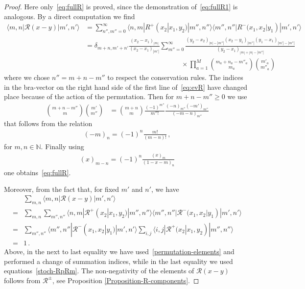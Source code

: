 \documentclass[11pt]{article}
\numberwithin{equation}{section}
\newcommand{\M}{M}
\newcommand{\eR}{\mathcal{R}}
\begin{document}
\begin{proof}

	Here only~\eqref{eq:fullR} is proved, since the demonstration of~\eqref{eq:fullR1} is analogous. By a direct computation we find
	\begin{equation}\label{eq:evR}
		\begin{split}
			\langle m,n|  {\eR}(x-y) |m',n'\rangle
		&=\sum_{n'',m''=0}^\infty \langle n,m|  {R}^+(x_2|x_1,y_2) |m'',n''\rangle \langle m'',n''|  {R}^-(x_1,x_2|y_1) |m',n'\rangle
			\\&=\delta_{m+n,{m'}+{n'}}\frac{(x_2-x_1)_{|m|}}{(x_2-x_1)_{|{m'}|}} \sum_{m''=0}^{\infty}\frac{\left( y_2-x_2\right)_{|n|-|m''|}\left(x_2-y_1\right)_{|m''|}\left(y_1-x_1\right)_{|{m'}|-|m''|}}{\left(y_2-x_1\right)_{|m|+|n|-|m''|}}
			\\&\qquad\qquad\qquad\qquad\qquad\qquad\qquad\times \prod_{a=1}^{\M}\binom{m_{a}+n_{a}-m''_{a}}{m_{a}}\binom{m'_{a}}{m''_{a}}
		\end{split}
	\end{equation}
	where we chose $n''=m+n-m''$ to respect the conservation rules. The indices in the bra-vector on the right hand side of the first line of~\eqref{eq:evR} have changed place because of the action of the permutation. Then for $m+n-m''\geq 0$ we use
	\begin{equation}
		\begin{split}
			\binom{m+n-m''}{m}\binom{m'}{m''}
			&=\binom{m+n}{m}\frac{(-1)^{m''}}{m''!}\frac{({-n})_{m''}(-m')_{m''}}{(-m-n)_{m''}}
		\end{split}
	\end{equation}
	that follows from the relation
	\begin{align}
		(-m)_{n}  =(-1)^{n}\frac{m!}{(m-n)!}\,,
	\end{align}
	for $m,n \in \mathbb{N}$.
	Finally using
	\begin{align}
		(x)_{m-n}=(-1)^{n}\frac{(x)_{m}}{(1-x-m)_{n}}
	\end{align}
	one obtains~\eqref{eq:fullR}.

Moreover, from the fact that, for fixed $m'$ and $n'$, we have
         \begin{equation}
	\begin{split}
		&\sum_{m,n}\langle m,n|{\eR}(x-y)|m',n'\rangle
		\\=&
		\sum_{m,n}\sum_{m'',n''}\langle n,m|  {\eR}^+(x_2|x_1,y_2) |m'',n''\rangle \langle m'',n''|  {\eR}^-(x_1,x_2|y_1) |m',n'\rangle
		\\=&
														              \sum_{m'',n''}\langle m'',n''|  {\eR}^-(x_1,x_2|y_1) |m',n'\rangle
				\sum_{i,j}\langle i,j|{\eR}^{+}(x_{2}|x_{1},y_{2})|m'',n''\rangle
        \\=&1\,.
	\end{split}
\end{equation}
Above, in the next to last equality we have used~\eqref{permutation-elements} and performed a change of summation indices, while in the last equality we used equations~\eqref{stoch-RpRm}. The non-negativity of the elements of $\eR(x-y)$ follows from $\eR^{\pm}$, see Proposition \ref{Proposition-R-components}.
 \end{proof}
\end{document}
